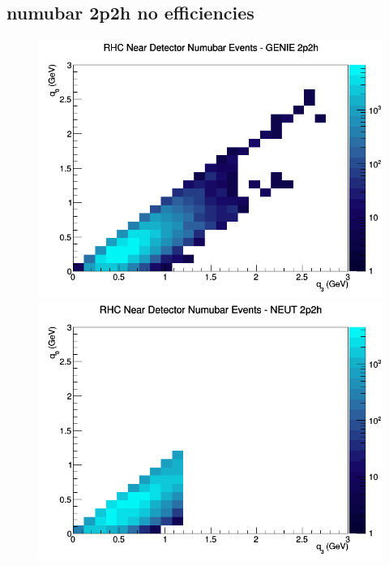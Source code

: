 \subsection{numubar 2p2h no efficiencies}
\begin{figure}[h]
\includegraphics[width=\linewidth]{q0_q3/nominal/2p2h_RHC_ND_numubar_q3_q0_GENIE.png}
\endminipage
{}
\includegraphics[width=\linewidth]{q0_q3/nominal/2p2h_RHC_ND_numubar_q3_q0_NEUT.png}
\endminipage
{}

\end{figure}
